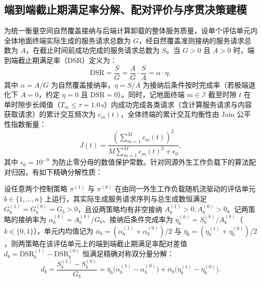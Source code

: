 \subsection{端到端截止期满足率分解、配对评价与序贯决策建模}
\label{sec:ch2-service-metrics}
\label{subsec:mappo}

为统一衡量空间自然覆盖接纳与后端计算卸载的整体服务质量，设单个评估单元内全体地面终端实际生成的服务请求总数为 $G$，经自然覆盖准则接纳的服务请求总数为 $A$，在截止时间前成功完成的服务请求总数为 $S$。当 $G>0$ 且 $A>0$ 时，端到端截止期满足率（DSR）定义为：
\begin{equation}
    \mathrm{DSR}=\frac{S}{G}
    =\frac{A}{G}\cdot\frac{S}{A}
    =\alpha\cdot\eta,
    \label{eq:ch1-dsr-factorization}
\end{equation}
其中 $\alpha=A/G$ 为自然覆盖接纳率，$\eta=S/A$ 为接纳后条件按时完成率（若极端退化下 $A=0$，约定 $\eta=0$ 且 $\mathrm{DSR}=0$）。同时，记地面终端 $m\in\mathcal{I}$ 截至时隙 $t$ 在单时隙步长阈值（$T_m\le\tau=1.0\,\mathrm{s}$）内成功完成各类请求（含计算服务请求与内容获取请求）的累计交互频次为 $c_m(t)$，全体终端的累计交互均衡性由 Jain 公平性指数\cite{jain1984quantitative}衡量：
\begin{equation}
    J(t)=\frac{\left(\sum_{m=1}^{M}c_m(t)\right)^2}
    {M\sum_{m=1}^{M}c_m(t)^2+\epsilon_0},
    \label{eq:ch2-jain}
\end{equation}
其中 $\epsilon_0=10^{-9}$ 为防止零分母的数值保护常数。针对同源外生工作负载下的算法配对归因，有如下精确分解性质：

\begin{lemma}[端到端截止期满足率双因子分解与同源配对对称差分性质]
设任意两个控制策略 $\pi^{(1)}$ 与 $\pi^{(0)}$ 在由同一外生工作负载随机流驱动的评估单元 $b\in\{1,\ldots,n\}$ 上运行，其实际生成服务请求序列与总生成数恒满足 $G_b^{(1)}=G_b^{(0)}=G_b>0$，且设两策略均有非空接纳 $A_b^{(1)}>0, A_b^{(0)}>0$。记两策略的接纳率为 $\alpha_b^{(k)}=A_b^{(k)}/G_b$、接纳后条件完成率为 $\eta_b^{(k)}=S_b^{(k)}/A_b^{(k)}$（$k\in\{0,1\}$），单元内均值记为 $\bar{\alpha}_b=(\alpha_b^{(1)}+\alpha_b^{(0)})/2$ 与 $\bar{\eta}_b=(\eta_b^{(1)}+\eta_b^{(0)})/2$，则两策略在该评估单元上的端到端截止期满足率配对差值 $d_b=\mathrm{DSR}_b^{(1)}-\mathrm{DSR}_b^{(0)}$ 恒满足精确对称双分量分解：
\begin{equation}
    d_b=\frac{S_b^{(1)}-S_b^{(0)}}{G_b}
    =\bar{\eta}_b\big(\alpha_b^{(1)}-\alpha_b^{(0)}\big)+\bar{\alpha}_b\big(\eta_b^{(1)}-\eta_b^{(0)}\big).
    \label{eq:ch2-dsr-symmetric-diff}
\end{equation}
\end{lemma}

